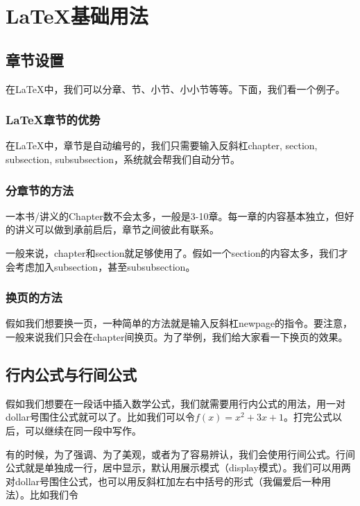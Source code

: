 \chapter{LaTeX基础用法}


\section{章节设置}


在LaTeX中，我们可以分章、节、小节、小小节等等。下面，我们看一个例子。

\subsection{LaTeX章节的优势}

在LaTeX中，章节是自动编号的，我们只需要输入反斜杠chapter, section, subsection, subsubsection，系统就会帮我们自动分节。

\subsection{分章节的方法}

一本书/讲义的Chapter数不会太多，一般是3-10章。每一章的内容基本独立，但好的讲义可以做到承前启后，章节之间彼此有联系。

一般来说，chapter和section就足够使用了。假如一个section的内容太多，我们才会考虑加入subsection，甚至subsubsection。

\subsection{换页的方法}

假如我们想要换一页，一种简单的方法就是输入反斜杠newpage的指令。要注意，一般来说我们只会在chapter间换页。为了举例，我们给大家看一下换页的效果。

\newpage




\section{行内公式与行间公式}

假如我们想要在一段话中插入数学公式，我们就需要用行内公式的用法，用一对dollar号围住公式就可以了。比如我们可以令$f(x)=x^2+3x+1$。打完公式以后，可以继续在同一段中写作。

有的时候，为了强调、为了美观，或者为了容易辨认，我们会使用行间公式。行间公式就是单独成一行，居中显示，默认用展示模式（display模式）。我们可以用两对dollar号围住公式，也可以用反斜杠加左右中括号的形式（我偏爱后一种用法）。比如我们令

